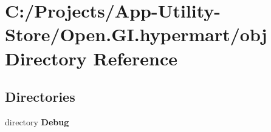 \section{C\+:/\+Projects/\+App-\/\+Utility-\/\+Store/\+Open.G\+I.\+hypermart/obj Directory Reference}
\label{dir_4eb4b99003a5f776388a4b39645b27dd}
\subsection*{Directories}
\begin{DoxyCompactItemize}
\item 
directory \textbf{ Debug}
\end{DoxyCompactItemize}
